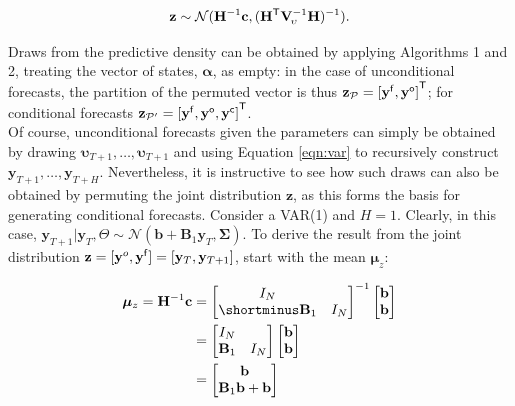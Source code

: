 \documentclass[notitlepage,a4paper,12pt]{article}
\newcommand{\transpose}[1]{{#1}^{\sf{T}}}
\begin{document}
$$
\mathbf{z} \sim \mathcal{N}(\mathbf{H}^{-1} \mathbf{c}, (\transpose{\mathbf{H}} \mathbf{V}^{-1}_{\!\upsilon}\mathbf{H})^{-1}).
$$

Draws from the predictive density can be obtained by applying Algorithms 1 and 2, treating the vector of states, $\boldsymbol{\alpha}$, as empty: in the case of unconditional forecasts, the partition of the permuted vector is thus $\mathbf{z}_{\mathcal{P}} = \transpose{[\mathbf{y}^{\sf{f}}, \mathbf{y}^{\sf{o}}]}$; for conditional forecasts $\mathbf{z}_{\mathcal{P}'} = \transpose{[\mathbf{y}^{\sf{f}}, \mathbf{y}^{\sf{o}}, \mathbf{y}^{\sf{c}}]}$.\\

Of course, unconditional forecasts given the parameters can simply be obtained by drawing $\boldsymbol{\upsilon}_{T+1}, \dots, \boldsymbol{\upsilon}_{T+1}$ and using Equation \ref{eqn:var} to recursively construct $\mathbf{y}_{T+1}, \dots, \mathbf{y}_{T+H}$. Nevertheless, it is instructive to see how such draws can also be obtained by permuting the joint distribution $\mathbf{z}$, as this forms the basis for generating conditional forecasts. Consider a VAR(1) and $H=1$. Clearly, in this case, $\mathbf{y}_{T+1}|\mathbf{y}_T, \Theta \sim \mathcal{N}(\mathbf{b} + \mathbf{B}_1 \mathbf{y}_T, \boldsymbol{\Sigma})$. To derive the result from the joint distribution $\mathbf{z} = [\mathbf{y}^o, \mathbf{y}^{\sf{f}}] = [\mathbf{y}_T, \mathbf{y}_{T+1}]$, start with the mean $\boldsymbol{\mu}_z$:

\begin{align*}
\boldsymbol{\mu}_z = \mathbf{H}^{-1} \mathbf{c} &= 
\begin{bmatrix}
    I_N \\
    \shortminus\mathbf{B}_1 & I_N 
\end{bmatrix}
^{-1}
\begin{bmatrix}
    \mathbf{b} \\
    \mathbf{b} 
\end{bmatrix}
\\
&= 
\begin{bmatrix}
    I_N \\
    \mathbf{B}_1 & I_N 
\end{bmatrix}
\begin{bmatrix}
    \mathbf{b} \\
    \mathbf{b} 
\end{bmatrix}
\\
&= 
\begin{bmatrix}
    \mathbf{b} \\
    \mathbf{B}_1\mathbf{b} + \mathbf{b} 
\end{bmatrix}
\end{align*}
\end{document}
